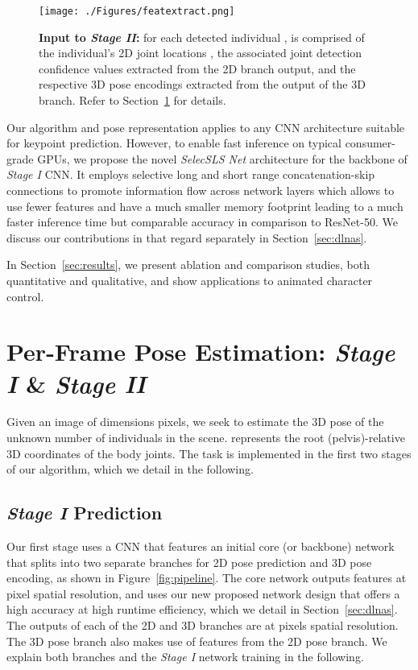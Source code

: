 \documentclass[acmtog,authorversion]{acmart}
\begin{document}
\begin{figure}[t]
  \texttt{[image: ./Figures/featextract.png]}
  \caption
  {\textbf{Input to \textit{Stage II}:}  for each detected individual , is comprised of the individual's 2D joint locations , the associated joint detection confidence values  extracted from the 2D branch output, and the respective 3D pose encodings  extracted from the output of the 3D branch.
Refer to Section~\ref{sec:per_frame_pose_est} for details.
  }
  \label{fig:feature_stage2}
  \vspace{-0.3cm}
\end{figure}
Our algorithm and pose representation applies to any CNN architecture suitable for keypoint prediction. However, to enable
fast inference on typical consumer-grade GPUs, we propose the novel \textit{SelecSLS Net} architecture for the backbone of \textit{Stage I} CNN.
It employs selective long and short range concatenation-skip connections to promote information flow across network layers which allows to use fewer features and have a much smaller memory footprint leading to a much faster inference time but comparable accuracy in comparison to ResNet-50. We discuss our contributions in that regard separately in Section~\ref{sec:dlnas}. 


In Section~\ref{sec:results}, we present ablation and comparison studies, both quantitative and qualitative, and show applications to animated character control.




\section{Per-Frame Pose Estimation: \textit{Stage I} \& \textit{Stage II}}
\label{sec:per_frame_pose_est}

Given an image  of dimensions  pixels, we seek to estimate the 3D pose  of the unknown number of  individuals in the scene. 
 represents the root (pelvis)-relative 3D coordinates of the  body joints. 
The task is implemented in the first two stages of our algorithm, which we detail in the following.


\subsection{\textit{Stage I} Prediction}
\label{sec:fisrt_stage}

Our first stage uses a CNN that features an initial core (or backbone) network that splits into two separate branches for 2D pose prediction and 3D pose encoding, as shown in Figure~\ref{fig:pipeline}. The core network outputs features at  pixel spatial resolution, and uses our new proposed network design that offers a high accuracy at high runtime efficiency, which we detail in Section~\ref{sec:dlnas}.
The outputs of each of the 2D and 3D branches are at  pixels spatial resolution. The 3D pose branch also makes use of features from the 2D pose branch. We explain both branches and the \textit{Stage I} network training in the following.  
\end{document}

